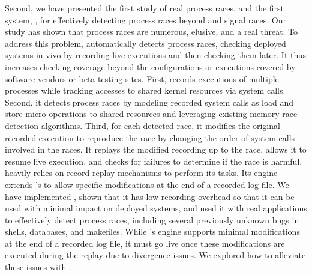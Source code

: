 Second, we have presented the first study of real process races, and the first
system, \racepro, for effectively detecting process races beyond \toctou
and signal races.   Our study has shown that process races are
numerous, elusive, and a real threat.  To address this problem, \racepro
automatically detects process races, checking deployed
systems in vivo by recording live executions and then checking
them later.  It thus increases checking coverage beyond the
configurations or executions covered by software vendors or beta
testing sites.  First, \racepro records executions of multiple processes
while tracking accesses to shared kernel resources via system
calls. Second, it detects process races by modeling recorded system
calls as load and store micro-operations to shared resources and
leveraging existing memory race detection algorithms.  Third, for each
detected race, it modifies the original recorded execution to
reproduce the race by changing the order of system calls involved in
the races.  It replays the modified recording up to the race, allows
it to resume live execution, and checks for failures to determine if
the race is harmful.
\racepro heavily relies on record-replay mechanisms to perform its tasks.
Its engine extends \scribe's to allow specific modifications at the end of
a recorded log file.
We have implemented \racepro, shown that it has
low recording overhead so that it can be used with minimal impact on
deployed systems, and used it with real applications to effectively
detect \nracepro process races, including several previously unknown
bugs in shells, databases, and makefiles.
While \racepro's engine supports minimal modifications at the end
of a recorded log file, it must go live once these modifications are
executed during the replay due to divergence issues. We explored
how to alleviate these issues with \dora.

